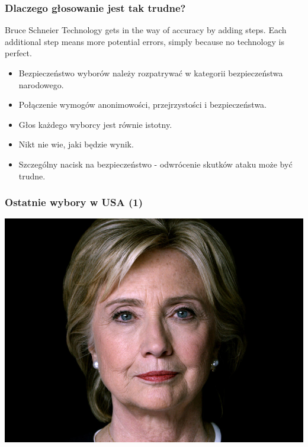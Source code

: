 \documentclass{beamer}
\begin{document}
\begin{frame}
\frametitle{Dlaczego głosowanie jest tak trudne?}\pause
\begin{block}{Bruce Schneier}
Technology gets in the way of accuracy by adding steps. Each additional step means more potential errors, simply because no technology is perfect.
\end{block}\pause
\begin{itemize}
\item Bezpieczeństwo wyborów należy rozpatrywać w kategorii bezpieczeństwa narodowego.\pause
\item Połączenie wymogów anonimowości, przejrzystości i bezpieczeństwa.\pause
\item Głos każdego wyborcy jest równie istotny.\pause
\item Nikt nie wie, jaki będzie wynik.\pause
\item Szczególny nacisk na bezpieczeństwo - odwrócenie skutków ataku może być trudne.
\end{itemize}
\end{frame}

\begin{frame}
\frametitle{Ostatnie wybory w USA (1)}
\includegraphics[height=0.8\paperheight, center]{clinton}
\end{frame}
\end{document}
